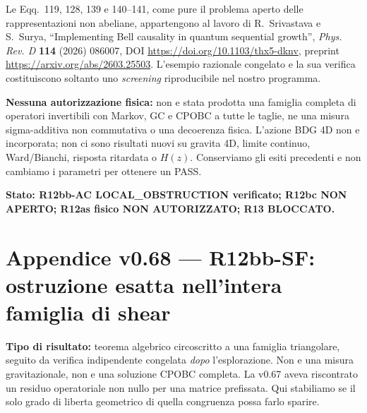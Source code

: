 \documentclass[11pt,a4paper]{article}
\begin{document}
Le Eqq.~119, 128, 139 e 140--141, come pure il problema aperto delle rappresentazioni non abeliane, appartengono al lavoro di R.~Srivastava e S.~Surya, ``Implementing Bell causality in quantum sequential growth'', \emph{Phys. Rev. D} \textbf{114} (2026) 086007, DOI \url{https://doi.org/10.1103/thx5-dknv}, preprint \url{https://arxiv.org/abs/2603.25503}. L'esempio razionale congelato e la sua verifica costituiscono soltanto uno \emph{screening} riproducibile nel nostro programma.

\textbf{Nessuna autorizzazione fisica:} non e stata prodotta una famiglia completa di operatori invertibili con Markov, GC e CPOBC a tutte le taglie, ne una misura sigma-additiva non commutativa o una decoerenza fisica. L'azione BDG 4D non e incorporata; non ci sono risultati nuovi su gravita 4D, limite continuo, Ward/Bianchi, risposta ritardata o $H(z)$. Conserviamo gli esiti precedenti e non cambiamo i parametri per ottenere un PASS.

\textbf{Stato: R12bb-AC LOCAL\_OBSTRUCTION verificato; R12bc NON APERTO; R12as fisico NON AUTORIZZATO; R13 BLOCCATO.}




\clearpage
\section*{Appendice v0.68 --- R12bb-SF: ostruzione esatta nell'intera famiglia di shear}
\textbf{Tipo di risultato:} teorema algebrico circoscritto a una famiglia triangolare, seguito da verifica indipendente congelata \emph{dopo} l'esplorazione. Non e una misura gravitazionale, non e una soluzione CPOBC completa. La v0.67 aveva riscontrato un residuo operatoriale non nullo per una matrice prefissata. Qui stabiliamo se il solo grado di liberta geometrico di quella congruenza possa farlo sparire.
\end{document}
